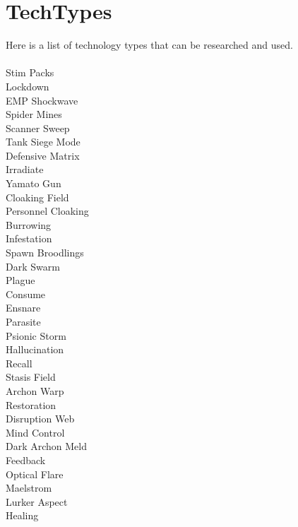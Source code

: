 \documentclass[english,11pt]{report}
\begin{document}
\chapter{TechTypes}
Here is a list of technology types that can be researched and used.\\
\\
Stim Packs\\
Lockdown\\
EMP Shockwave\\
Spider Mines\\
Scanner Sweep\\
Tank Siege Mode\\
Defensive Matrix\\
Irradiate\\
Yamato Gun\\
Cloaking Field\\
Personnel Cloaking\\
Burrowing\\
Infestation\\
Spawn Broodlings\\
Dark Swarm\\
Plague\\
Consume\\
Ensnare\\
Parasite\\
Psionic Storm\\
Hallucination\\
Recall\\
Stasis Field\\
Archon Warp\\
Restoration\\
Disruption Web\\
Mind Control\\
Dark Archon Meld\\
Feedback\\
Optical Flare\\
Maelstrom\\
Lurker Aspect\\
Healing
\end{document}
